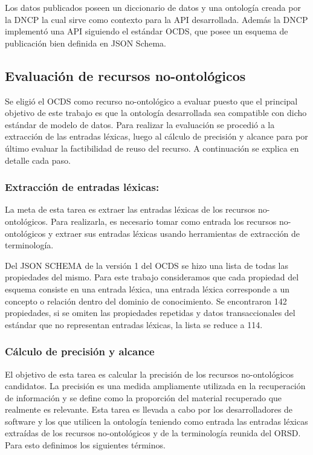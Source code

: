 Los datos publicados poseen un diccionario de datos y una ontología creada por la DNCP la cual sirve como contexto para la API desarrollada. Además la DNCP implementó una API siguiendo el estándar OCDS, que posee un esquema de publicación bien definida en JSON Schema.

\subsection{Evaluación de recursos no-ontológicos}
Se eligió el OCDS como recurso no-ontológico a evaluar puesto que el principal objetivo de este trabajo es que la ontología desarrollada sea compatible con dicho estándar de modelo de datos. Para realizar la evaluación se procedió a la extracción de las entradas léxicas, luego al cálculo de precisión y alcance para por último evaluar la factibilidad de reuso del recurso.  A continuación se explica en detalle cada paso.

\subsubsection{Extracción de entradas léxicas:}
La meta de esta tarea es extraer las entradas léxicas de los recursos no-ontológicos. Para realizarla, es necesario tomar como entrada los recursos no-ontológicos y extraer sus entradas léxicas usando herramientas de extracción de terminología.	
			
Del JSON SCHEMA de la versión 1 del OCDS se hizo una lista de todas las propiedades del mismo. Para este trabajo consideramos que cada propiedad del esquema consiste en una entrada léxica, una entrada léxica corresponde a un concepto o relación dentro del dominio de conocimiento. Se encontraron 142 propiedades, si se omiten las propiedades repetidas y datos transaccionales del estándar que no representan entradas léxicas, la lista se reduce a 114.

\subsubsection{Cálculo de precisión y alcance}

El objetivo de esta tarea es calcular la precisión de los recursos no-ontológicos candidatos. La precisión es una medida ampliamente utilizada en la recuperación de información y se define como la proporción del material recuperado que realmente es relevante. Esta tarea es llevada a cabo por los desarrolladores de software y los que utilicen la ontología teniendo como entrada las entradas léxicas extraídas de los recursos no-ontológicos y de la terminología reunida del ORSD. Para esto definimos los siguientes términos.

